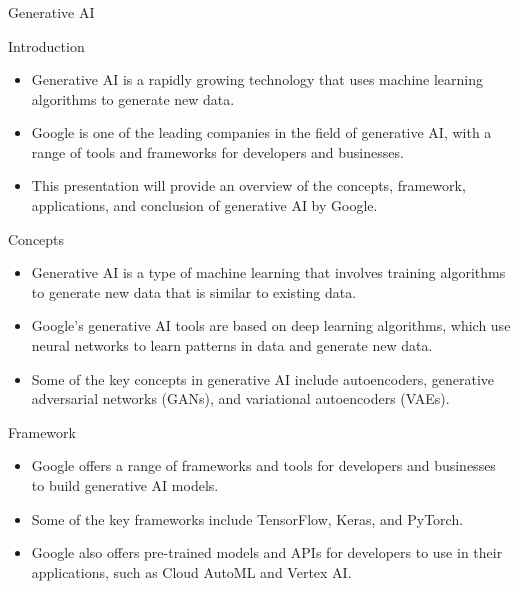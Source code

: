 \begin{frame}[fragile]\frametitle{}
\begin{center}
{\Large Generative AI}
\end{center}
\end{frame}

\begin{frame}[fragile]{Introduction}
\begin{itemize}
\item Generative AI is a rapidly growing technology that uses machine learning algorithms to generate new data.
\item Google is one of the leading companies in the field of generative AI, with a range of tools and frameworks for developers and businesses.
\item This presentation will provide an overview of the concepts, framework, applications, and conclusion of generative AI by Google.
\end{itemize}
\end{frame}

\begin{frame}[fragile]{Concepts}
\begin{itemize}
\item Generative AI is a type of machine learning that involves training algorithms to generate new data that is similar to existing data.
\item Google's generative AI tools are based on deep learning algorithms, which use neural networks to learn patterns in data and generate new data.
\item Some of the key concepts in generative AI include autoencoders, generative adversarial networks (GANs), and variational autoencoders (VAEs).
\end{itemize}
\end{frame}

\begin{frame}[fragile]{Framework}
\begin{itemize}
\item Google offers a range of frameworks and tools for developers and businesses to build generative AI models.
\item Some of the key frameworks include TensorFlow, Keras, and PyTorch.
\item Google also offers pre-trained models and APIs for developers to use in their applications, such as Cloud AutoML and Vertex AI.
\end{itemize}
\end{frame}

